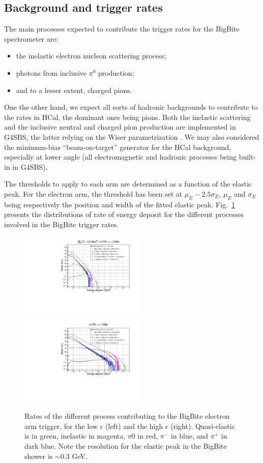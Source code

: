 \subsection{Background and trigger rates}
The main processes expected to contribute the trigger rates for the BigBite spectrometer are:
%
\begin{itemize}
\item{the inelastic electron nucleon scattering process;}
\item{photons from inclusive $\pi^0$ production;}
\item{and to a lesser extent, charged pions.}
\end{itemize}
%
One the other hand, we expect all sorts of hadronic backgrounds to contribute to the rates in HCal, the dominant ones being pions.
Both the inelastic scattering and the inclusive neutral and charged pion production are implemented in G4SBS, the latter relying on the Wiser parametrization \cite{wiser}.
We may also considered the minimum-bias ``beam-on-target'' generator for the HCal background, especially at lower angle (all electromagnetic and hadronic processes being built-in in G4SBS).

The thresholds to apply to each arm are determined as a function of the elastic peak.
For the electron arm, the threshold has been set at $\mu_E - 2.5 \sigma_E$,  $\mu_E$ and $\sigma_E$ being respectively the position and width of the fitted elastic peak. 
Fig.~\ref{fig:BBRates} presents the distributions of rate of energy deposit for the different processes involved in the BigBite trigger rates. 

\begin{figure}[!h]
  \centering
    \includegraphics[width=6cm]{Plots/BBECalRates_gen-tpe_le.pdf}
    \includegraphics[width=6cm]{Plots/BBECalRates_gen-tpe_he.pdf}
    \caption{Rates of the different process contributing to the BigBite electron arm trigger, for the low $\epsilon$ (left) and the high $\epsilon$ (right). Quasi-elastic is in green, inelastic in magenta, $\pi0$ in red, $\pi^-$ in blue, and $\pi^+$ in dark blue. Note the resolution for the elastic peak in the BigBite shower is $\sim0.3$ GeV.}
    \label{fig:BBRates}
\end{figure}

